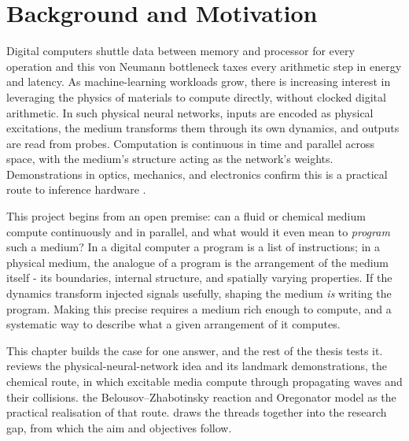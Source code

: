 
\section{Background and Motivation}
\label{sec:background}

Digital computers shuttle data between memory and processor for every operation and this von Neumann bottleneck taxes every arithmetic step in energy and latency.
As machine-learning workloads grow, there is increasing interest in leveraging the physics of materials to compute directly, without clocked digital arithmetic.
In such physical neural networks, inputs are encoded as physical excitations, the medium transforms them through its own dynamics, and outputs are read from probes.
Computation is continuous in time and parallel across space, with the medium's structure acting as the network's weights.
Demonstrations in optics, mechanics, and electronics confirm this is a practical route to inference hardware \cite{lin2018alloptical, wright2022deep, hughes2019wave}.

This project begins from an open premise: can a fluid or chemical medium compute continuously and in parallel, and what would it even mean to \emph{program} such a medium?
In a digital computer a program is a list of instructions; in a physical medium, the analogue of a program is the arrangement of the medium itself - its boundaries, internal structure, and spatially varying properties.
If the dynamics transform injected signals usefully, shaping the medium \emph{is} writing the program.
Making this precise requires a medium rich enough to compute, and a systematic way to describe what a given arrangement of it computes.

This chapter builds the case for one answer, and the rest of the thesis tests it.
 reviews the physical-neural-network idea and its landmark demonstrations, 
 the chemical route, in which excitable media compute through propagating waves and their collisions.
 the Belousov--Zhabotinsky reaction and Oregonator model as the practical realisation of that route.
 draws the threads together into the research gap, from which the aim and objectives follow.

